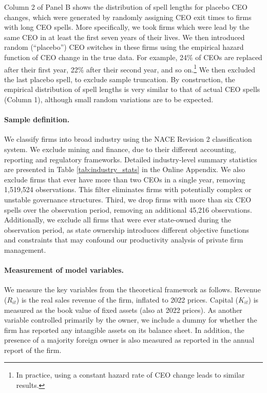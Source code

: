 \documentclass[11pt,a4paper]{article}
\begin{document}
Column 2 of Panel B shows the distribution of spell lengths for placebo CEO changes, which were generated by randomly assigning CEO exit times to firms with long CEO spells. More specifically, we took firms which were lead by the same CEO in at least the first seven years of their lives. We then introduced random (``placebo'') CEO switches in these firms using the empirical hazard function of CEO change in the true data. For example, 24\% of CEOs are replaced after their first year, 22\% after their second year, and so on.\footnote{In practice, using a constant hazard rate of CEO change leads to similar results.} We then excluded the last placebo spell, to exclude sample truncation. By construction, the empirical distribution of spell lengths is very similar to that of actual CEO spells (Column 1), although small random variations are to be expected.

\paragraph{Sample definition.} 
We classify firms into broad industry using the NACE Revision 2 classification system. We exclude mining and finance, due to their different accounting, reporting and regulatory frameworks. Detailed industry-level summary statistics are presented in Table \ref{tab:industry_stats} in the Online Appendix. We also exclude firms that ever have more than two CEOs in a single year, removing 1,519,524 observations. This filter eliminates firms with potentially complex or unstable governance structures. Third, we drop firms with more than six CEO spells over the observation period, removing an additional 45,216 observations. Additionally, we exclude all firms that were ever state-owned during the observation period, as state ownership introduces different objective functions and constraints that may confound our productivity analysis of private firm management.

\paragraph{Measurement of model variables.} We measure the key variables from the theoretical framework as follows. Revenue ($R_{it}$) is the real sales revenue of the firm, inflated to 2022 prices. Capital ($K_{it}$) is measured as the book value of fixed assets (also at 2022 prices). As another variable controlled primarily by the owner, we include a dummy for whether the firm has reported any intangible assets on its balance sheet. In addition, the presence of a majority foreign owner is also measured as reported in the annual report of the firm.
\end{document}
